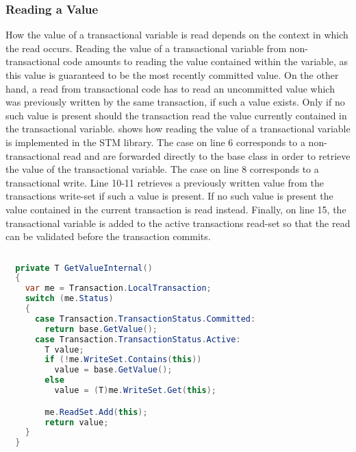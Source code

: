 \subsubsection{Reading a Value}
\label{sec:stm_imple_internal_detials_read}
How the value of a transactional variable is read depends on the context in which the read occurs. Reading the value of a transactional variable from non-transactional code amounts to reading the value contained within the variable, as this value is guaranteed to be the most recently committed value. On the other hand, a read from transactional code has to read an uncommitted value which was previously written by the same transaction, if such a value exists. Only if no such value is present should the transaction read the value currently contained in the transactional variable.  shows how reading the value of a transactional variable is implemented in the \ac{STM} library. The case on line 6 corresponds to a non-transactional read and are forwarded directly to the base class in order to retrieve the value of the transactional variable. The case on line 8 corresponds to a transactional write. Line 10-11 retrieves a previously written value from the transactions write-set if such a value is present. If no such value is present the value contained in the current transaction is read instead. Finally, on line 15, the transactional variable is added to the active transactions read-set so that the read can be validated before the transaction commits.
\begin{lstlisting}[label=lst:library_read_value,
  caption={Reading a Transactional Variable},
  language=Java,  
  showspaces=false,
  showtabs=false,
  breaklines=true,
  showstringspaces=false,
  breakatwhitespace=true,
  commentstyle=\color{greencomments},
  keywordstyle=\color{bluekeywords},
  stringstyle=\color{redstrings},
  morekeywords={atomic, retry, orElse, var, get, set}]  % Start your code-block
  
  private T GetValueInternal()
  {
    var me = Transaction.LocalTransaction;
    switch (me.Status)
    {
      case Transaction.TransactionStatus.Committed:
        return base.GetValue();
      case Transaction.TransactionStatus.Active:
        T value;
        if (!me.WriteSet.Contains(this))
          value = base.GetValue();
        else
          value = (T)me.WriteSet.Get(this);

        me.ReadSet.Add(this);
        return value;
    }
  }
\end{lstlisting}
